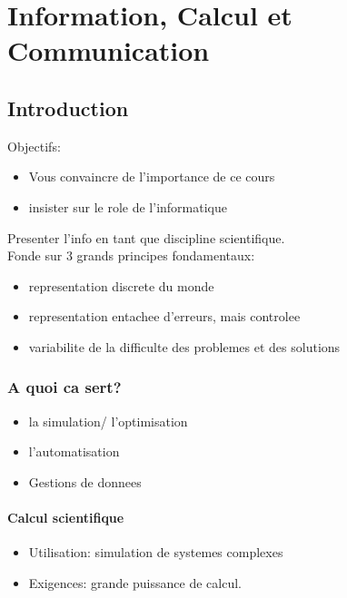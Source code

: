 \documentclass[../main.tex]{subfiles}
\begin{document}
\chapter{Information, Calcul et Communication}
\section{Introduction}

Objectifs:\\
\begin{itemize}
	\item Vous convaincre de l'importance de ce cours\\
	\item insister sur le role de l'informatique
\end{itemize}

Presenter l'info en tant  que discipline scientifique.\\
Fonde sur 3 grands principes fondamentaux:
\begin{itemize}
	\item representation discrete du monde\\
	\item representation entachee d'erreurs, mais controlee\\
	\item variabilite de la difficulte des problemes et des solutions 
\end{itemize}
\subsection{A quoi ca sert?}
\begin{itemize}
	\item la simulation/ l'optimisation\\
	\item l'automatisation\\
	\item Gestions de donnees
\end{itemize}
\subsubsection{Calcul scientifique}
\begin{itemize}
	\item Utilisation: simulation de systemes complexes\\
	\item Exigences: grande puissance de calcul.
\end{itemize}
\end{document}
